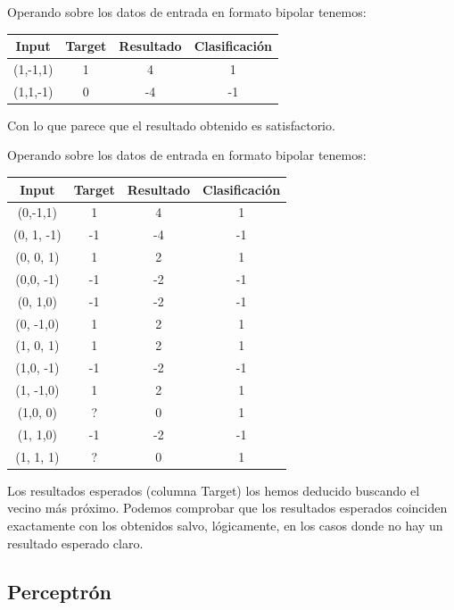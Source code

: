 \begin{problem}[6]
\spart
Operando sobre los datos de entrada en formato bipolar tenemos:
\begin{center}
\begin{tabular}{|c|c|c|c|}
\hline
\textbf{Input} & \textbf{Target} & \textbf{Resultado} & \textbf{Clasificación}\\
\hline
(1,-1,1) & 1 &  4 & 1\\
(1,1,-1) & 0 & -4 & -1\\
\hline
\end{tabular}
\end{center}
Con lo que parece que el resultado obtenido es satisfactorio.

\spart
Operando sobre los datos de entrada en formato bipolar tenemos:
\begin{center}
\begin{tabular}{|c|c|c|c|}
\hline
\textbf{Input} & \textbf{Target} & \textbf{Resultado} & \textbf{Clasificación}\\
\hline
(0,-1,1)   &  1 & 4  & 1\\
(0, 1, -1) & -1 & -4  & -1\\
(0, 0, 1)  &  1 & 2  & 1\\
(0,0, -1)  & -1 & -2 & -1\\
(0, 1,0)   & -1 & -2 & -1\\
(0, -1,0)  &  1 & 2 & 1\\
(1, 0, 1)  &  1 & 2 & 1\\
(1,0, -1)  & -1 & -2 & -1\\
(1, -1,0)  &  1 & 2 & 1\\
(1,0, 0)   &  ? & 0  & 1\\
(1, 1,0)   & -1 & -2 & -1\\
(1, 1, 1)  &  ? & 0 & 1\\
\hline
\end{tabular}
\end{center}

Los resultados esperados (columna Target) los hemos deducido buscando el vecino más próximo. Podemos comprobar que los resultados esperados coinciden exactamente con los obtenidos salvo, lógicamente, en los casos donde no hay un resultado esperado claro.

\end{problem}

\subsection{Perceptrón}


